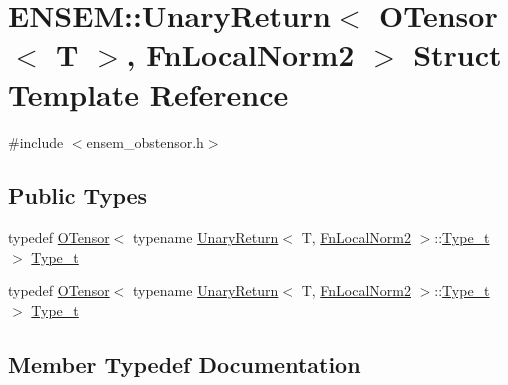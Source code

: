 \hypertarget{structENSEM_1_1UnaryReturn_3_01OTensor_3_01T_01_4_00_01FnLocalNorm2_01_4}{}\section{E\+N\+S\+EM\+:\+:Unary\+Return$<$ O\+Tensor$<$ T $>$, Fn\+Local\+Norm2 $>$ Struct Template Reference}
\label{structENSEM_1_1UnaryReturn_3_01OTensor_3_01T_01_4_00_01FnLocalNorm2_01_4}


{\ttfamily \#include $<$ensem\+\_\+obstensor.\+h$>$}

\subsection*{Public Types}
\begin{DoxyCompactItemize}
\item 
typedef \mbox{\hyperlink{classENSEM_1_1OTensor}{O\+Tensor}}$<$ typename \mbox{\hyperlink{structENSEM_1_1UnaryReturn}{Unary\+Return}}$<$ T, \mbox{\hyperlink{structENSEM_1_1FnLocalNorm2}{Fn\+Local\+Norm2}} $>$\+::\mbox{\hyperlink{structENSEM_1_1UnaryReturn_3_01OTensor_3_01T_01_4_00_01FnLocalNorm2_01_4_a6d6f8fdbc603bf32e2db2deaca0b82fa}{Type\+\_\+t}} $>$ \mbox{\hyperlink{structENSEM_1_1UnaryReturn_3_01OTensor_3_01T_01_4_00_01FnLocalNorm2_01_4_a6d6f8fdbc603bf32e2db2deaca0b82fa}{Type\+\_\+t}}
\item 
typedef \mbox{\hyperlink{classENSEM_1_1OTensor}{O\+Tensor}}$<$ typename \mbox{\hyperlink{structENSEM_1_1UnaryReturn}{Unary\+Return}}$<$ T, \mbox{\hyperlink{structENSEM_1_1FnLocalNorm2}{Fn\+Local\+Norm2}} $>$\+::\mbox{\hyperlink{structENSEM_1_1UnaryReturn_3_01OTensor_3_01T_01_4_00_01FnLocalNorm2_01_4_a6d6f8fdbc603bf32e2db2deaca0b82fa}{Type\+\_\+t}} $>$ \mbox{\hyperlink{structENSEM_1_1UnaryReturn_3_01OTensor_3_01T_01_4_00_01FnLocalNorm2_01_4_a6d6f8fdbc603bf32e2db2deaca0b82fa}{Type\+\_\+t}}
\end{DoxyCompactItemize}


\subsection{Member Typedef Documentation}
\mbox{\label{structENSEM_1_1UnaryReturn_3_01OTensor_3_01T_01_4_00_01FnLocalNorm2_01_4_a6d6f8fdbc603bf32e2db2deaca0b82fa}} 
